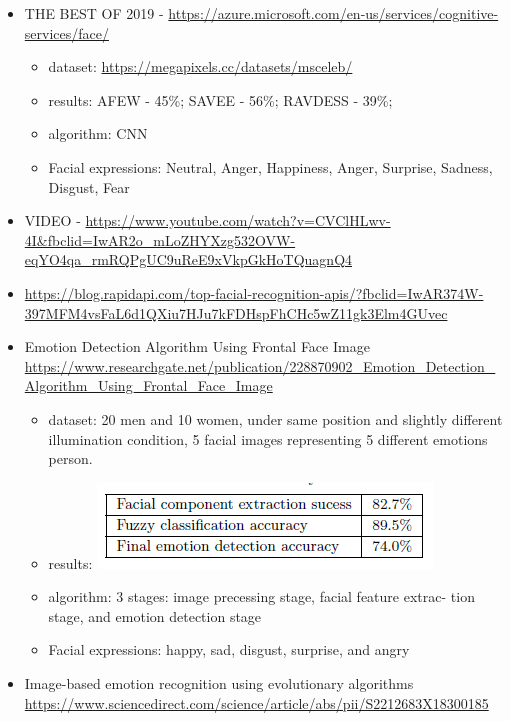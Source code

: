 \documentclass[a4paper,12pt]{article}
\begin{document}
    \begin{itemize}
        \item THE BEST OF 2019 - \url{https://azure.microsoft.com/en-us/services/cognitive-services/face/}
        \begin{itemize}
            \item dataset: \url{https://megapixels.cc/datasets/msceleb/}
            \item results: AFEW - 45\%; SAVEE - 56\%; RAVDESS - 39\%;
            \item algorithm: CNN
            \item Facial expressions: Neutral, Anger, Happiness, Anger, Surprise, Sadness, Disgust, Fear
        \end{itemize}
        \item VIDEO - \url{https://www.youtube.com/watch?v=CVClHLwv-4I&fbclid=IwAR2o_mLoZHYXzg532OVW-eqYO4qa_rmRQPgUC9uReE9xVkpGkHoTQuagnQ4}
        \item \url{https://blog.rapidapi.com/top-facial-recognition-apis/?fbclid=IwAR374W-397MFM4vsFaL6d1QXiu7HJu7kFDHspFhCHc5wZ11gk3Elm4GUvec}       
        \item  Emotion Detection Algorithm Using Frontal Face Image \url{https://www.researchgate.net/publication/228870902_Emotion_Detection_Algorithm_Using_Frontal_Face_Image}
        \begin{itemize}
            \item dataset: 20 men and 10 women, under same
            position and slightly different illumination condition, 5 facial
            images representing 5 different emotions
            person.
            \item results: \includegraphics[]{emotion-accuracy.png}
            \item algorithm: 3 stages: image precessing stage, facial feature extrac-
            tion stage, and emotion detection stage
            \item Facial expressions: happy, sad, disgust, surprise,
            and angry
        \end{itemize}
        \item Image-based emotion recognition using evolutionary algorithms \url{https://www.sciencedirect.com/science/article/abs/pii/S2212683X18300185}

\end{itemize}
\end{document}
